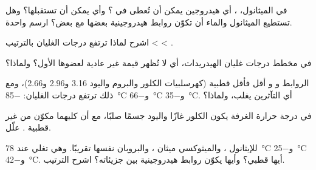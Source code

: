 \begin{exercise}[$\star\star$]\label{exo:g11:polarity-and-cohesion:7}
في الميثانول، ، أي  هيدروجين يمكن أن تُعطى في ؟ وأي  يمكن أن تستقبلها؟ وهل تستطيع  الميثانول والماء أن تكوّن
روابط هيدروجينية بعضها مع بعض؟ ارسم واحدة.
\end{exercise}

\begin{exercise}[$\star\star$]\label{exo:g11:polarity-and-cohesion:8}
اشرح لماذا ترتفع درجات الغليان بالترتيب  <
 < .
\end{exercise}

\begin{exercise}[$\star\star$]\label{exo:g11:polarity-and-cohesion:9}
في مخطط درجات غليان الهيدريدات، أي  لا تُظهر قيمة غير عادية لعضوها
الأول؟ ولماذا؟
\end{exercise}

\begin{exercise}[$\star\star$]\label{exo:g11:polarity-and-cohesion:10}
الروابط  و و أقل فأقل قطبية (كهرسلبيات الكلور والبروم
واليود 3.16 و2.96 و2.66)، ومع ذلك ترتفع درجات الغليان: \qty{-85}{\celsius}
و\qty{-66}{\celsius} و\qty{-35}{\celsius}. أي التآثرين يغلب،
ولماذا؟
\end{exercise}

\begin{exercise}[$\star\star$]\label{exo:g11:polarity-and-cohesion:11}
في درجة حرارة الغرفة يكون الكلور غازًا واليود جسمًا صلبًا، مع أن كليهما مكوّن من
 غير قطبية . علّل.
\end{exercise}

\begin{exercise}[$\star\star\star$]\label{exo:g11:polarity-and-cohesion:12}
للإيثانول ، والميثوكسي ميثان ، والبروبان
  نفسها تقريبًا. وهي تغلي عند
\qty{78}{\celsius} و\qty{-25}{\celsius} و\qty{-42}{\celsius}. أيها
قطبي؟ وأيها يكوّن روابط هيدروجينية بين جزيئاته؟ اشرح
الترتيب.
\end{exercise}

